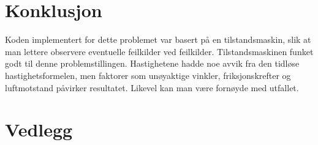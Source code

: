 \documentclass[11pt, a4paper]{report}
\begin{document}
\section{Konklusjon}
Koden implementert for dette problemet var basert på en tilstandsmaskin, slik at man lettere observere eventuelle feilkilder ved feilkilder. Tilstandsmaskinen funket godt til denne problemstillingen. Hastighetene hadde noe avvik fra den tidløse hastighetsformelen, men faktorer som unøyaktige vinkler, friksjonskrefter og luftmotstand påvirker resultatet. Likevel kan man være fornøyde med utfallet. 

\newpage
\section{Vedlegg}


\end{document}
